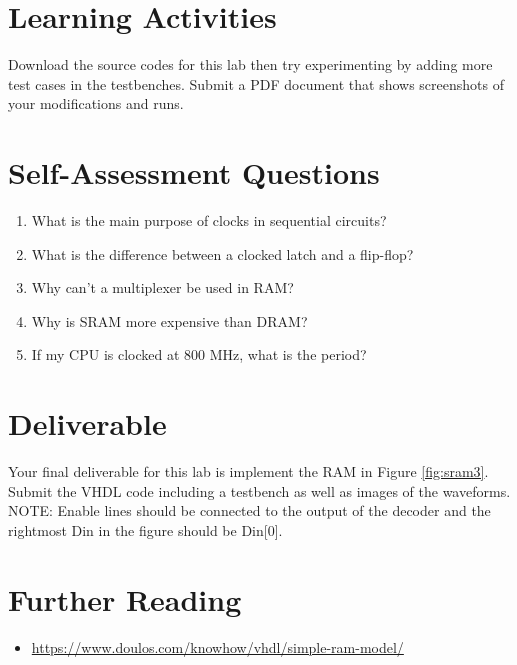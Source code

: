\documentclass[a4paper, 11pt,oneside]{article}
\begin{document}
\section{Learning Activities}
Download the source codes for this lab then try experimenting by adding more 
test cases in the testbenches. Submit a PDF document that shows screenshots of 
your modifications and runs. 

\section{Self-Assessment Questions}
\begin{enumerate}
\item What is the main purpose of clocks in sequential circuits?
\item What is the difference between a clocked latch and a flip-flop?
\item Why can't a multiplexer be used in RAM?
\item Why is SRAM more expensive than DRAM?
\item If my CPU is clocked at 800 MHz, what is the period?
\end{enumerate}


\section{Deliverable}
Your final deliverable for this lab is implement the RAM in Figure 
 \ref{fig:sram3}. Submit the VHDL code including a testbench as well as images 
of the waveforms. NOTE: Enable lines should be connected to the output of the 
decoder and the rightmost Din in the figure should be Din[0].

\section{Further Reading}
\begin{itemize}
\item 
\href{https://www.doulos.com/knowhow/vhdl/simple-ram-model/}
{https://www.doulos.com/knowhow/vhdl/simple-ram-model/}
\end{itemize}





\nocite{*}
\end{document}
